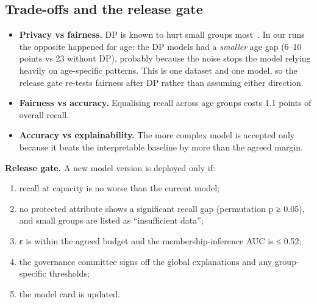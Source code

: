 \documentclass[10pt,a4paper]{article}
\begin{document}
\subsection{Trade-offs and the release gate}\label{sec:4.4}
\begin{itemize}
\item \textbf{Privacy vs fairness.} DP is known to hurt small groups most~\cite{bagdasaryan2019}. In our runs the opposite happened for age: the DP models had a \emph{smaller} age gap (6–10 points vs 23 without DP), probably because the noise stops the model relying heavily on age-specific patterns. This is one dataset and one model, so the release gate re-tests fairness after DP rather than assuming either direction.
\item \textbf{Fairness vs accuracy.} Equalising recall across age groups costs 1.1 points of overall recall.
\item \textbf{Accuracy vs explainability.} The more complex model is accepted only because it beats the interpretable baseline by more than the agreed margin.
\end{itemize}

\textbf{Release gate.} A new model version is deployed only if:
\begin{enumerate}
\item recall at capacity is no worse than the current model;
\item no protected attribute shows a significant recall gap (permutation p ≥ 0.05), and small groups are listed as “insufficient data”;
\item ε is within the agreed budget and the membership-inference AUC is ≤ 0.52;
\item the governance committee signs off the global explanations and any group-specific thresholds;
\item the model card is updated.
\end{enumerate}
\end{document}
